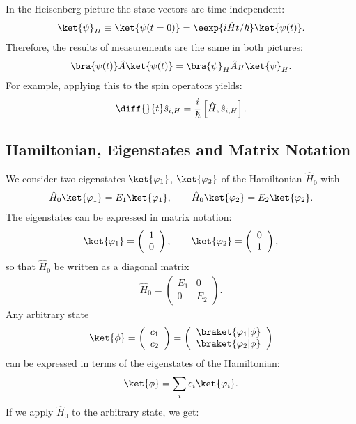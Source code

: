 					In the Heisenberg picture the state vectors are time-in\-de\-pen\-dent:
					\begin{align}
						\ket{\psi}_H \equiv \ket{\psi(t=0)}=\eexp{i{\hat{H}}t/{\hbar}} \ket{\psi(t)}.
					\end{align}
					Therefore, the results of measurements are the same in both pictures:
					\begin{align}
						\bra{\psi(t)}\hat{A}\ket{\psi(t)} = \bra{\psi}_H \hat{A}_H \ket{\psi}_H.
					\end{align}
					For example, applying this to the spin operators yields:
					\begin{align}
						\diff{}{t}\hat{s}_{i,H}=\frac{i}{\hbar}\left[\hat{H},\hat{s}_{i,H}\right].
					\end{align}

		\subsection{Hamiltonian, Eigenstates and Matrix Notation}

			We consider two eigenstates $\ket{\varphi_1}$, $\ket{\varphi_2}$ of the Hamiltonian $\hat{H}_0$ with
			\begin{align}
				\hat{H}_0\ket{\varphi_1}=E_1\ket{\varphi_1}, \qquad \hat{H}_0\ket{\varphi_2}=E_2\ket{\varphi_2}.
			\end{align}
			The eigenstates can be expressed in matrix notation:
			\begin{align}
				\ket{\varphi_1}=\left( \begin{array}{c} 1 \\ 0 \end{array} \right), \qquad \ket{\varphi_2}=\left( \begin{array}{c} 0 \\ 1 \end{array} \right),
			\end{align}
			so that $\hat{H}_0$ be written as a diagonal matrix
			\begin{align}
				\hat{H}_0 = \left(\begin{array}{cc} E_1 & 0 \\ 0 & E_2 \end{array}\right).
			\end{align}
			Any arbitrary state 
			\begin{align}
				\ket{\phi} = \left( \begin{array}{c} c_1 \\ c_2 \end{array} \right) = \left( \begin{array}{c} \braket{\varphi_1|\phi} \\ \braket{\varphi_2|\phi} \end{array} \right)
			\end{align}
			can be expressed in terms of the eigenstates of the Hamiltonian:
			\begin{align}
				\ket{\phi} = \sum_i c_i \ket{\varphi_i}.
			\end{align}
			If we apply $\hat{H}_0$ to the arbitrary state, we get:

